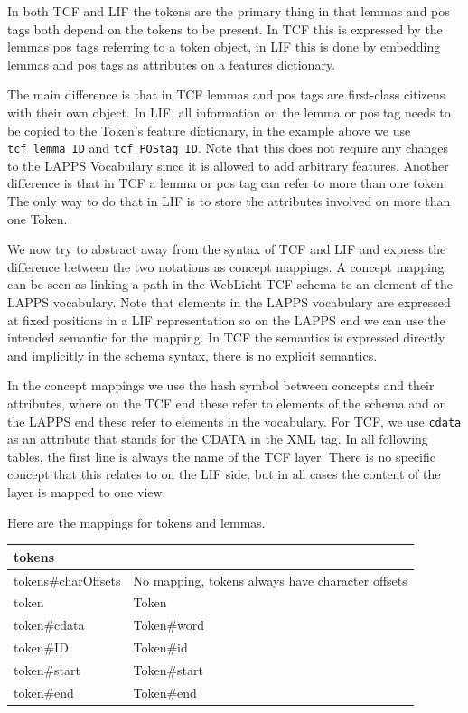 \documentclass[11pt]{article}
\newcommand{\tag}[1]{{\tt #1}}
\newcommand{\attr}[1]{{\tt #1}}
\newenvironment{mappings}
	{\medskip\begin{tabular}{|l|l|}\hline}
	{\hline\end{tabular}\medskip}
\begin{document}
In both TCF and LIF the tokens are the primary thing in that lemmas and pos tags both depend on the tokens to be present. In TCF this is expressed by the lemmas pos tags referring to a token object, in LIF this is done by embedding lemmas and pos tags as attributes on a features dictionary.

The main difference is that in TCF lemmas and pos tags are first-class citizens with their own object. In LIF, all information on the lemma or pos tag needs to be copied to the Token's feature dictionary, in the example above we use \tag{tcf\_lemma\_ID} and \tag{tcf\_POStag\_ID}. Note that this does not require any changes to the LAPPS Vocabulary since it is allowed to add arbitrary features. Another difference is that in TCF a lemma or pos tag can refer to more than one token. The only way to do that in LIF is to store the attributes involved on more than one Token.
 
We now try to abstract away from the syntax of TCF and LIF and express the difference between the two notations as concept mappings. A concept mapping can be seen as linking a path in the WebLicht TCF schema to an element of the LAPPS vocabulary. Note that elements in the LAPPS vocabulary are expressed at fixed positions in a LIF representation so on the LAPPS end we can use the intended semantic for the mapping. In TCF the semantics is expressed directly and implicitly in the schema syntax, there is no explicit semantics.

In the concept mappings we use the hash symbol between concepts and their attributes, where on the TCF end these refer to elements of the schema and on the LAPPS end these refer to elements in the vocabulary. For TCF, we use \attr{cdata} as an attribute that stands for the CDATA in the XML tag. In all following tables, the first line is always the name of the TCF layer. There is no specific concept that this relates to on the LIF side, but in all cases the content of the layer is mapped to one view.

\newpage
Here are the mappings for tokens and lemmas.

\begin{mappings}
tokens				&  \\ \hline
tokens\#charOffsets & No mapping, tokens always have character offsets \\ \hline
token 				& Token \\ \hline
token\#cdata		& Token\#word \\ \hline
token\#ID 			& Token\#id \\ \hline
token\#start 		& Token\#start \\ \hline
token\#end			& Token\#end \\
\end{mappings}
\end{document}
